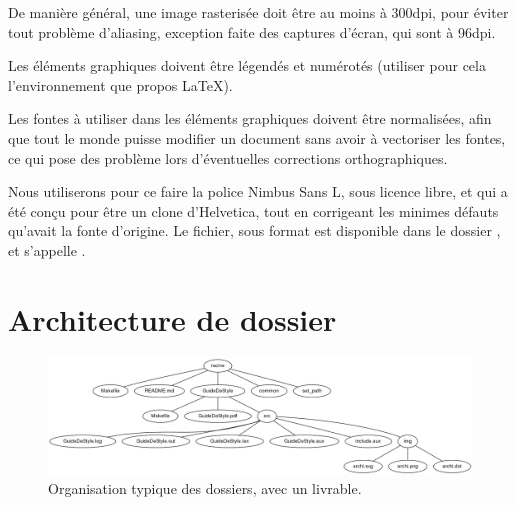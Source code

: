 De manière général, une image rasterisée doit être au moins à 300dpi, pour
éviter tout problème d'aliasing, exception faite des captures d'écran, qui sont
à 96dpi.

Les éléments graphiques doivent être légendés et numérotés (utiliser pour cela
l'environnement  que propos \LaTeX).

Les fontes à utiliser dans les éléments graphiques doivent être normalisées,
afin que tout le monde puisse modifier un document sans avoir à vectoriser les
fontes, ce qui pose des problème lors d'éventuelles corrections orthographiques.

Nous utiliserons pour ce faire la police Nimbus Sans L, sous licence libre, et
qui a été conçu pour être un clone d'Helvetica, tout en corrigeant les minimes
défauts qu'avait la fonte d'origine. Le fichier, sous format  est
disponible dans le dossier , et s'appelle .

\section{Architecture de dossier}
\begin{figure}[h!]
\includegraphics[width=\textwidth]{img/archi.png}
\caption{Organisation typique des dossiers, avec un livrable.}
\end{figure}

